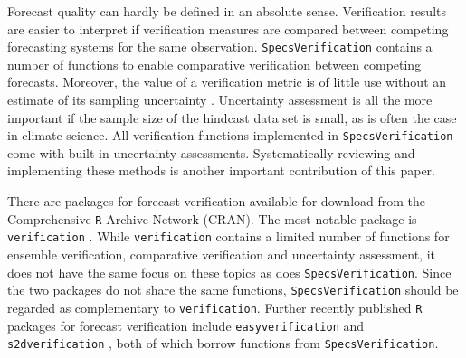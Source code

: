 \documentclass[10pt]{article}\usepackage[]{graphicx}\usepackage[]{color}
\newcommand{\proglang}[1]{\texttt{#1}}
\newcommand{\pkg}[1]{\texttt{#1}}
\begin{document}
Forecast quality can hardly be defined in an absolute sense.
Verification results are easier to interpret if verification measures are compared between competing forecasting systems for the same observation.
\pkg{SpecsVerification} contains a number of functions to enable comparative verification between competing forecasts.
Moreover, the value of a verification metric is of little use without an estimate of its sampling uncertainty \citep{jolliffe2007uncertainty}.
Uncertainty assessment is all the more important if the sample size of the hindcast data set is small, as is often the case in climate science.
All verification functions implemented in \pkg{SpecsVerification} come with built-in uncertainty assessments.
Systematically reviewing and implementing these methods is another important contribution of this paper.


There are packages for forecast verification available for download from the Comprehensive \proglang{R} Archive Network (CRAN).
The most notable package is \pkg{verification} \citep{cran_verification}. 
While \pkg{verification} contains a limited number of functions for ensemble verification, comparative verification and uncertainty assessment, it does not have the same focus on these topics as does \pkg{SpecsVerification}.
Since the two packages do not share the same functions, \pkg{SpecsVerification} should be regarded as complementary to \pkg{verification}.
Further recently published \proglang{R} packages for forecast verification include \pkg{easyverification} \citep{cran_easyverification} and \pkg{s2dverification} \citep{cran_s2dverification}, both of which borrow functions from \pkg{SpecsVerification}.
\end{document}
